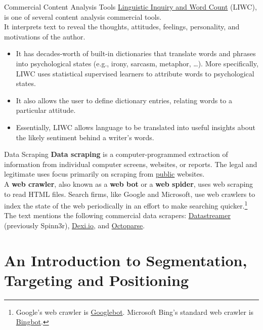 \documentclass[pdf]{beamer}
\newcommand{\empr}[1]{{\color{franklinblue}\textbf{#1}}}
\theoremstyle{remark}
\theoremstyle{definition}
\begin{document}
\begin{frame}[t]{Commercial Content Analysis Tools}
\href{https://www.liwc.app/}{Linguistic Inquiry and Word Count} (LIWC), %
is one of several content analysis commercial tools. \\
\vspace{1.5ex}
It interprets text to reveal the thoughts, attitudes, feelings, personality, and motivations of the author. 
\begin{itemize}
\item It has decades-worth of built-in dictionaries that translate words and phrases into psychological states (e.g., irony, sarcasm, metaphor, \ldots).  More specifically, LIWC uses statistical supervised learners to attribute words to psychological states.
\item It also allows the user to define dictionary entries, relating words to a particular attitude. 
\item Essentially, LIWC allows language to be translated into useful insights about the likely sentiment behind a writer's words.
\end{itemize}
\end{frame}

\begin{frame}[t]{Data Scraping}
\empr{Data scraping} is a computer-programmed extraction of information from individual computer screens, websites, or reports. The legal and legitimate uses focus primarily on scraping from \underline{public} websites. \\
\vspace{1.5ex}
A \empr{web crawler}, also known as a \empr{web bot} or a \empr{web spider}, uses web scraping to read HTML files.  Search firms, like Google and Microsoft, use web crawlers to index the state of the web periodically in an effort to make searching quicker.\footnote{Google's web crawler is \href{https://developers.google.com/search/docs/crawling-indexing/googlebot}{Googlebot}. Microsoft Bing's standard web crawler is \href{https://www.bing.com/webmasters/help/which-crawlers-does-bing-use-8c184ec0}{Bingbot}.} \\
\vspace{1.5ex}
The text mentions the following commercial data scrapers: \href{https://datastreamer.io/}{Datastreamer} (previously Spinn3r), \href{https://www.dexi.io//}{Dexi.io}, and \href{https://www.octoparse.com/}{Octoparse}.
\end{frame}

\section{An Introduction to Segmentation, Targeting and Positioning }
\end{document}
